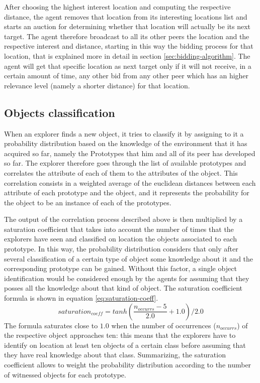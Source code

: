 \documentclass[a4paper, 10pt, conference]{ieeeconf}      %
\begin{document}
After choosing the highest interest location and computing the respective distance, the agent removes that location from its interesting locations list and starts an auction for determining whether that location will actually be its next target. The agent therefore broadcast to all its other peers the location and the respective interest and distance, starting in this way the bidding process for that location, that is explained more in detail in section \ref{sec:bidding-algorithm}. The agent will get that specific location as next target only if it will not receive, in a certain amount of time, any other bid from any other peer which has an higher relevance level (namely a shorter distance) for that location. 




\subsection{Objects classification}\label{sec:object-classification}
When an explorer finds a new object, it tries to classify it by assigning to it a probability distribution based on the knowledge of the environment that it has acquired so far, namely the Prototypes that him and all of its peer has developed so far. The explorer therefore goes through the list of available prototypes and correlates the attribute of each of them to the attributes of the object. This correlation consists in a weighted average of the euclidean distances between each attribute of each prototype and the object, and it represents the probability for the object to be an instance of each of the prototypes. 

The output of the correlation process described above is then multiplied by a saturation coefficient that takes into account the number of times that the explorers have seen and classified on location the objects associated to each prototype. In this way, the probability distribution considers that only after several classification of a certain type of object some knowledge about it and the corresponding prototype can be gained. Without this factor, a single object identification would be considered enough by the agents for assuming that they posses all the knowledge about that kind of object. The saturation coefficient formula is shown in equation \eqref{eq:saturation-coeff}.
\begin{equation}\label{eq:saturation-coeff}
    saturation_{coeff} = tanh(\frac{n_{occurrs}-5}{2.0}+1.0)/2.0
\end{equation}
The formula saturates close to $1.0$ when the number of occurrences ($n_{occurrs}$) of the respective object approaches ten: this means that the explorers have to identify on location at least ten objects of a certain class before assuming that they have real knowledge about that class. Summarizing, the saturation coefficient allows to weight the probability distribution according to the number of witnessed objects for each prototype. 
\end{document}
